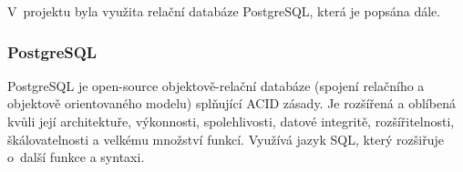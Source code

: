 	V~projektu byla využita relační databáze PostgreSQL, která je popsána dále.
	
		\subsubsection{PostgreSQL}
		PostgreSQL je open-source objektově-relační databáze (spojení relačního a objektově orientovaného modelu) splňující ACID zásady. Je rozšířená a oblíbená kvůli její architektuře, výkonnosti, spolehlivosti, datové integritě, rozšířitelnosti, škálovatelnosti a velkému množství funkcí. Využívá jazyk SQL, který rozšiřuje o~další funkce a syntaxi. \cite{PostgreSQL}
